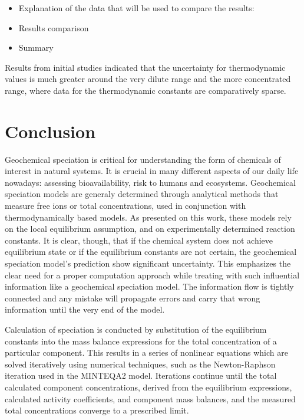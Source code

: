 \documentclass[ppgc,mestrado,english]{iiufrgs}
\begin{document}
\begin{itemize}
\item Explanation of the data that will be used to compare the results: 
\item Results comparison 
\item	Summary
\end{itemize}

Results from initial studies indicated that the uncertainty for thermodynamic values is much greater around the very dilute range and the more concentrated range, where data for the thermodynamic constants are comparatively sparse. 


\chapter{Conclusion}

Geochemical speciation is critical for understanding the form of chemicals of interest in natural systems. It is crucial in many different aspects of our daily life nowadays: assessing bioavailability, risk to humans and ecosystems. Geochemical speciation models are generaly determined through analytical methods that measure free ions or total concentrations, used in conjunction with thermodynamically based models. As presented on this work, these models rely on the local equilibrium assumption, and on experimentally determined reaction constants. It is clear, though, that if the chemical system does not achieve equilibrium state or if the equilibrium constants are not certain, the geochemical speciation model's prediction show significant uncertainty.
This emphasizes the clear need for a proper computation approach while treating with such influential information like a geochemical speciation model. The information flow is tightly connected and any mistake will propagate errors and carry that wrong information until the very end of the model.

Calculation of speciation is conducted by substitution of the equilibrium constants into the mass balance expressions for the total concentration of a particular component. This results in a series of nonlinear equations which are solved iteratively using numerical techniques, such as the Newton-Raphson iteration used in the MINTEQA2 model. Iterations continue until the total calculated component concentrations, derived from the equilibrium expressions, calculated activity coefficients, and component mass balances, and the measured total concentrations converge to a prescribed limit.
\end{document}
